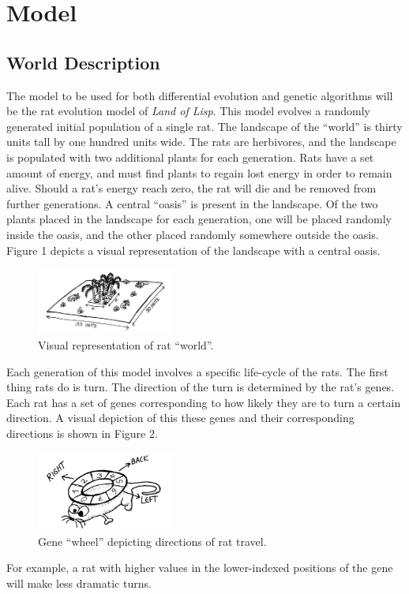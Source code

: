 \documentclass{sig-alternate}
\begin{document}
\section{Model}

\subsection{World Description}
The model to be used for both differential evolution and genetic algorithms will be the rat evolution model of \emph{Land of Lisp}.  This model evolves a randomly generated initial population of a single rat.  The landscape of the ``world'' is thirty units tall by one hundred units wide.  The rats are herbivores, and the landscape is populated with two additional plants for each generation.  Rats have a set amount of energy, and must find plants to regain lost energy in order to remain alive.  Should a rat's energy reach zero, the rat will die and be removed from further generations.  A central ``oasis'' is present in the landscape.  Of the two plants placed in the landscape for each generation, one will be placed randomly inside the oasis, and the other placed randomly somewhere outside the oasis.  Figure 1 depicts a visual representation of the landscape with a central oasis. \cite{LOL}
\begin{figure}
\centering
\includegraphics[width=0.4\textwidth]{landscape.PNG}
\caption{Visual representation of rat ``world''.}
\end{figure}

Each generation of this model involves a specific life-cycle of the rats.  The first thing rats do is turn.  The direction of the turn is determined by the rat's genes.  Each rat has a set of genes corresponding to how likely they are to turn a certain direction.  A visual depiction of this these genes and their corresponding directions is shown in Figure 2.  \cite{LOL}
\begin{figure}
\centering
\includegraphics[width=0.4\textwidth]{rat_wheel.PNG}
\caption{Gene ``wheel'' depicting directions of rat travel.}
\end{figure}
For example, a rat with higher values in the lower-indexed positions of the gene will make less dramatic turns.  
\end{document}
